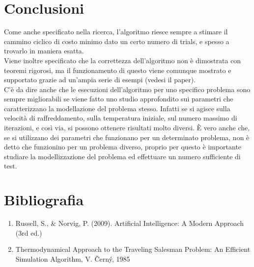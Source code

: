 \documentclass[11pt]{article}
\begin{document}
    \section{Conclusioni} \label{sec:conclusiona}

        Come anche specificato nella ricerca, l'algoritmo riesce sempre a stimare il cammino ciclico di costo minimo dato un certo numero di trials,
        e spesso a trovarlo in maniera esatta. \\
        Viene inoltre specificato che la correttezza dell'algoritmo non è dimostrata con teoremi rigorosi, ma il funzionamento di
        questo viene comunque mostrato e supportato grazie ad un'ampia serie di esempi (vedesi il paper). \\
        C'è da dire anche che le esecuzioni dell'algoritmo per uno specifico problema sono sempre migliorabili se viene fatto uno studio approfondito
        sui parametri che caratterizzano la modellazione del problema stesso. Infatti se si agisce sulla velocità di raffreddamento, sulla temperatura iniziale,
        sul numero massimo di iterazioni, e così via, si possono ottenere risultati molto diversi. È vero anche che, se si utilizzano dei parametri che
        funzionano per un determinato problema, non è detto che funzionino per un problema diverso, proprio per questo è importante studiare
        la modellizzazione del problema ed effettuare un numero sufficiente di test.

    \section{Bibliografia} \label{sec:bibliography}

        \begin{enumerate}
            \item Russell, S., \& Norvig, P. (2009). Artificial Intelligence: A Modern Approach (3rd ed.)
            \item Thermodynamical Approach to the Traveling Salesman Problem: An Efficient Simulation Algorithm, V. Černý, 1985
        \end{enumerate}
\end{document}
